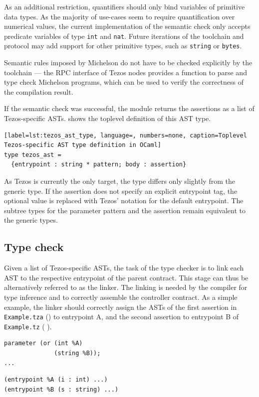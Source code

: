 As an additional restriction, quantifiers should only bind variables of primitive data types. As the majority of use-cases seem to require quantification over numerical values, the current implementation of the semantic check only accepts predicate variables of type \texttt{int} and \texttt{nat}. Future iterations of the toolchain and protocol may add support for other primitive types, such as \texttt{string} or \texttt{bytes}.

Semantic rules imposed by Michelson do not have to be checked explicitly by the toolchain --- the RPC interface of Tezos nodes provides a function to parse and type check Michelson programs, which can be used to verify the correctness of the compilation result.

If the semantic check was successful, the module returns the assertions as a list of Tezos-specific ASTs.  shows the toplevel definition of this AST type.
\begin{lstlisting}[label=lst:tezos_ast_type, language=, numbers=none, caption=Toplevel Tezos-specific AST type definition in OCaml]
type tezos_ast =
  {entrypoint : string * pattern; body : assertion}
\end{lstlisting}
As Tezos is currently the only target, the type differs only slightly from the generic type. If the assertion does not specify an explicit entrypoint tag, the optional value is replaced with Tezos' notation for the default entrypoint. The subtree types for the parameter pattern and the assertion remain equivalent to the generic types.

\subsection{Type check}\label{sec:typecheck}
Given a list of Tezos-specific ASTs, the task of the type checker is to link each AST to the respective entrypoint of the parent contract. This stage can thus be alternatively referred to as the linker. The linking is needed by the compiler for type inference and to correctly assemble the controller contract. As a simple example, the linker should correctly assign the ASTs of the first assertion in \texttt{Example.tza} () to entrypoint A, and the second assertion to entrypoint B of \texttt{Example.tz} ( ).

\vspace{\baselineskip}
\noindent
\begin{minipage}{.45\textwidth}
\begin{lstlisting}[label=lst:linker_parent, numbers=none, language=Michelson, caption=Example.tz]
parameter (or (int %A)
              (string %B));
...
\end{lstlisting}
\end{minipage}\hfill
\begin{minipage}{.5\textwidth}
\begin{lstlisting}[label=lst:linker_assertion, numbers=none, language=Assertion, caption=Example.tza]
(entrypoint %A (i : int) ...)
(entrypoint %B (s : string) ...)
\end{lstlisting}
\end{minipage}
\vspace{\baselineskip}

